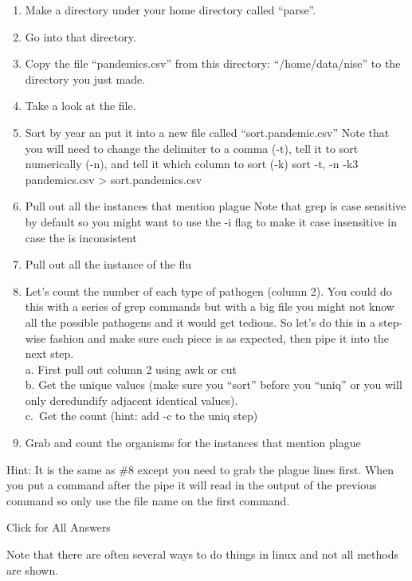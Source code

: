 \documentclass[
]{book}
\begin{document}
\begin{enumerate}
\def\labelenumi{\arabic{enumi}.}
\item
  Make a directory under your home directory called ``parse''.
\item
  Go into that directory.
\item
  Copy the file ``pandemics.csv'' from this directory: ``/home/data/nise'' to the directory you just made.
\item
  Take a look at the file.
\item
  Sort by year an put it into a new file called ``sort.pandemic.csv''
  Note that you will need to change the delimiter to a comma (-t), tell it to sort numerically (-n), and tell it which column to sort (-k) sort -t, -n -k3 pandemics.csv \textgreater{} sort.pandemics.csv
\item
  Pull out all the instances that mention plague
  Note that grep is case sensitive by default so you might want to use the -i flag to make it case insensitive in case the is inconsistent
\item
  Pull out all the instance of the flu
\item
  Let's count the number of each type of pathogen (column 2). You could do this with a series of grep commands but with a big file you might not know all the possible pathogens and it would get tedious. So let's do this in a step-wise fashion and make sure each piece is as expected, then pipe it into the next step.\\
  a. First pull out column 2 using awk or cut\\
  b. Get the unique values (make sure you ``sort'' before you ``uniq'' or you will only deredundify adjacent identical values).\\
  c.~Get the count (hint: add -c to the uniq step)
\item
  Grab and count the organisms for the instances that mention plague
\end{enumerate}

Hint: It is the same as \#8 except you need to grab the plague lines first. When you put a command after the pipe it will read in the output of the previous command so only use the file name on the first command.

Click for All Answers

Note that there are often several ways to do things in linux and not all methods are shown.
\end{document}
